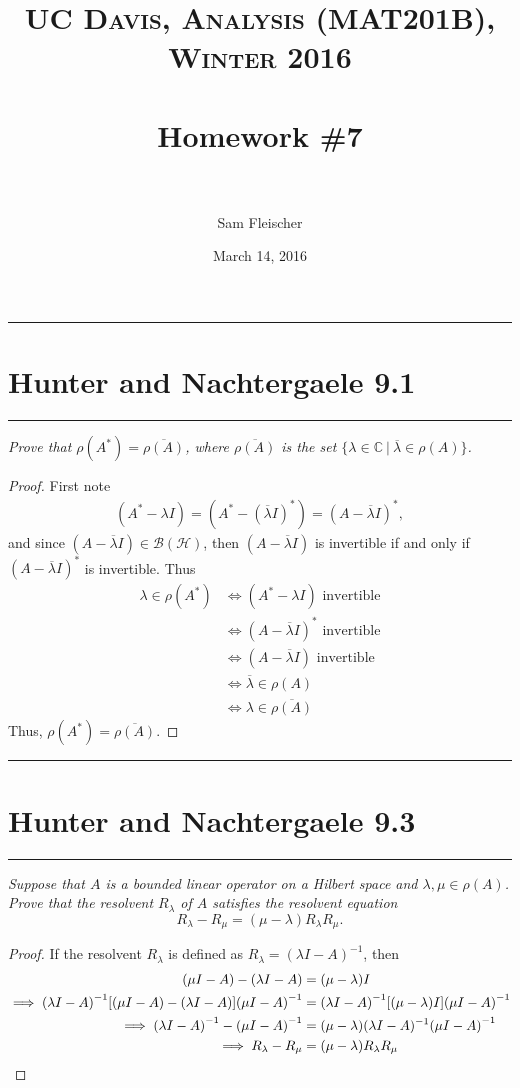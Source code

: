 \documentclass{article} %
\title{ 
\normalfont \normalsize 
\textsc{UC Davis, Analysis (MAT201B), Winter 2016} \\ [25pt] %
\horrule{2pt} \\[0.4cm] %
\Huge Homework \#7 \\ %
\horrule{2pt} \\[0.5cm] %
}
\author{\huge Sam Fleischer} %
\date{March 14, 2016} %
\theoremstyle{plain}
\def\Cx{\mathbb{C}}
\newcommand{\Hilb}{\mathcal{H}}
\newcommand{\problem}[1]{
\vspace{.375cm}
\begin{minipage}{\textwidth}
    \begin{center}
        \noindent\rule{5cm}{1pt}
    \end{center}
    \section{\bf #1}
    \begin{center}
        \noindent\rule{5cm}{1pt}
    \end{center}
    \vspace{0.25cm}
\end{minipage}
}
\numberwithin{equation}{section} %
\numberwithin{figure}{section} %
\numberwithin{table}{section} %
\begin{document}
\thispagestyle{empty}

\maketitle %

\makeatletter
{}
\makeatother

\pagebreak

\problem{Hunter and Nachtergaele 9.1}
\emph{Prove that $\rho(A^*) = \overline{\rho(A)}$, where $\overline{\rho(A)}$ is the set $\{\lambda \in \Cx\ |\ \overline{\lambda} \in \rho(A)\}$.}
\begin{proof}
    First note
    \begin{align*}
        (A^* - \lambda I) = (A^* - (\overline{\lambda}I)^*) = (A - \overline{\lambda}I)^*,
    \end{align*}
    and since $(A - \overline{\lambda}I) \in \mathcal{B}(\Hilb)$, then $(A - \overline{\lambda}I)$ is invertible if and only if $(A - \overline{\lambda}I)^*$ is invertible.  Thus
    \begin{align*}
        \lambda \in \rho(A^*) &\iff (A^* - \lambda I) \text{ invertible} \\
        &\iff (A - \overline{\lambda}I)^* \text{ invertible} \\
        &\iff (A - \overline{\lambda} I) \text{ invertible} \\
        &\iff \overline{\lambda} \in \rho(A) \\
        &\iff \lambda \in \overline{\rho(A)}
    \end{align*}
    Thus, $\rho(A^*) = \overline{\rho(A)}$.
\end{proof}









\problem{Hunter and Nachtergaele 9.3}
\emph{Suppose that $A$ is a bounded linear operator on a Hilbert space and $\lambda,\mu \in \rho(A)$.  Prove that the resolvent $R_\lambda$ of $A$ satisfies the \emph{resolvent equation} $$R_\lambda - R_\mu = (\mu - \lambda)R_\lambda R_\mu.$$}
\begin{proof}
    If the resolvent $R_\lambda$ is defined as $R_\lambda = (\lambda I - A)^{-1}$, then
    \begin{align*}
        \qty(\mu I - A) - \qty(\lambda I - A) &= (\mu - \lambda)I \\
        \implies \qty(\lambda I - A)^{-1}\qty[\qty(\mu I - A) - \qty(\lambda I - A)]\qty(\mu I - A)^{-1} &= \qty(\lambda I - A)^{-1}\qty[(\mu - \lambda)I]\qty(\mu I - A)^{-1} \\
        \implies \qty(\lambda I - A)^{-1} - \qty(\mu I - A)^{-1} &= \qty(\mu - \lambda)(\lambda I - A)^{-1}\qty(\mu I - A)^{-1} \\
        \implies R_\lambda - R_\mu &= (\mu - \lambda)R_\lambda R_\mu
    \end{align*}
\end{proof}
\end{document}
